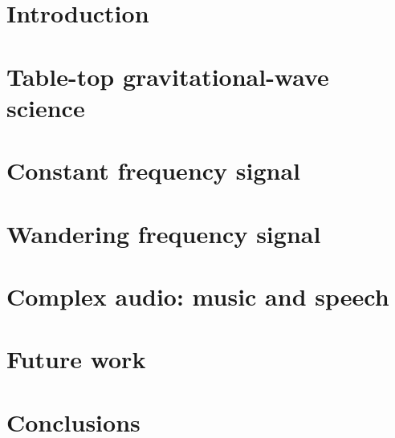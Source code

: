 \documentclass[aps,pra,superscriptaddress,reprint]{revtex4-1}
\begin{document}
\maketitle

\section{Introduction}
\label{sec:introduction}



\section{Table-top gravitational-wave science}
\label{sec:ifo}



\section{Constant frequency signal}
\label{sec:single_tone}


 
\section{Wandering frequency signal}
\label{sec:viterbi_wandering}



\section{Complex audio: music and speech}
\label{sec:optical_microphone}



\section{Future work}
\label{sec:future_work}



\section{Conclusions}
\label{sec:conclusions}

\end{document}
